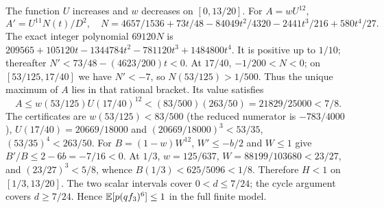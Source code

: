 The function $U$ increases and $w$ decreases on $[0,13/20]$.
For $A=wU^{12}$,
\[
 A'=U^{11}N(t)/D^2,\quad
 N=4657/1536+73t/48-84049t^2/4320-2441t^3/216+580t^4/27.
\]
The exact integer polynomial $69120N$ is
$209565+105120t-1344784t^2-781120t^3+1484800t^4$.
It is positive up to $1/10$; thereafter
$N'<73/48-(4623/200)t<0$.
At $17/40$, $-1/200<N<0$; on $[53/125,17/40]$ we have $N'<-7$,
so $N(53/125)>1/500$.
Thus the unique maximum of $A$ lies in that rational bracket.
Its value satisfies
\[
 A\le w(53/125)U(17/40)^{12}
 <(83/500)(263/50)=21829/25000<7/8.
\]
The certificates are $w(53/125)<83/500$ (the reduced numerator is
$-783/4000$), $U(17/40)=20669/18000$ and
$(20669/18000)^3<53/35$, $(53/35)^4<263/50$.
For $B=(1-w)W^{12}$, $W'\le-b/2$ and $W\le1$ give
$B'/B\le2-6b=-7/16<0$.
At $1/3$, $w=125/637$, $W=88199/103680<23/27$,
and $(23/27)^3<5/8$, whence $B(1/3)<625/5096<1/8$.
Therefore $H<1$ on $[1/3,13/20]$.
The two scalar intervals cover $0<d\le7/24$; the cycle argument covers
$d\ge7/24$. Hence $\mathbb E[p(qf_3)^6]\le1$ in the full finite model.
